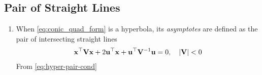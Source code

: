 \documentclass[journal,12pt,twocolumn]{IEEEtran}
\renewcommand\thesection{\arabic{section}}
\renewcommand\thesubsection{\thesection.\arabic{subsection}}
\begin{document}
\subsection{Pair of Straight Lines}
\renewcommand{\theequation}{\theenumi}
\begin{enumerate}[label=\thesubsection.\arabic*.,ref=\thesubsection.\theenumi]
\item When \eqref{eq:conic_quad_form} is a hyperbola, its  {\em asymptotes}  are defined as the pair of intersecting straight lines 
  \begin{align}
  \label{eq:asymp_quad_form}
  \mathbf{x}^{\top}\mathbf{V}\mathbf{x}+2\mathbf{u}^{\top}\mathbf{x}+\mathbf{u}^{\top}\mathbf{V}^{-1}\mathbf{u}=0, \quad \left\vert\mathbf{V}\right\vert < 0
  \end{align}
  \solution From 
	  \eqref{eq:hyper-pair-cond}
  

\end{enumerate}
\end{document}
